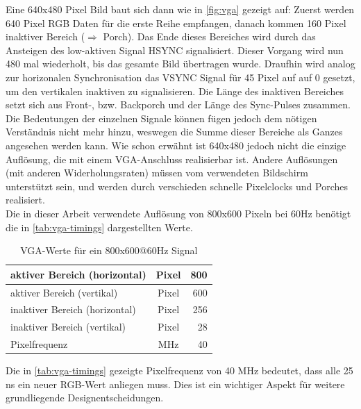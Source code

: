 \documentclass[a4paper,12pt,onesided]{report}
\begin{document}
Eine 640x480 Pixel Bild baut sich dann wie in \autoref{fig:vga} gezeigt auf:
Zuerst werden 640 Pixel RGB Daten für die erste Reihe empfangen, danach kommen 160 Pixel inaktiver Bereich ($\Rightarrow$ Porch). Das Ende dieses Bereiches wird durch das Ansteigen des low-aktiven Signal HSYNC signalisiert. Dieser Vorgang wird nun 480 mal wiederholt, bis das gesamte Bild übertragen wurde. Draufhin wird analog zur horizonalen Synchronisation das VSYNC Signal für 45 Pixel auf auf 0 gesetzt, um den vertikalen inaktiven zu signalisieren. Die Länge des inaktiven Bereiches setzt sich aus Front-, bzw. Backporch und der Länge des Sync-Pulses zusammen. Die Bedeutungen der einzelnen Signale können fügen jedoch dem nötigen Verständnis nicht mehr hinzu, weswegen die Summe dieser Bereiche als Ganzes angesehen werden kann.
Wie schon erwähnt ist 640x480 jedoch nicht die einzige Auflösung, die mit einem VGA-Anschluss realisierbar ist. Andere Auflösungen (mit anderen Widerholungsraten) müssen vom verwendeten Bildschirm unterstützt sein, und werden durch verschieden schnelle Pixelclocks und Porches realisiert.\\
Die in dieser Arbeit verwendete Auflösung von 800x600 Pixeln bei 60Hz benötigt die in \autoref{tab:vga-timings} dargestellten Werte.

\begin{table}[H]
	\centering
	\begin{tabular}{|l|c|r|}	
		\hline
		aktiver Bereich (horizontal) & Pixel & 800 \\ \hline
		aktiver Bereich (vertikal) & Pixel & 600 \\ \hline
		inaktiver Bereich (horizontal) & Pixel & 256 \\ \hline
		inaktiver Bereich (vertikal) & Pixel & 28 \\ \hline
		Pixelfrequenz & MHz & 40 \\ \hline
	\end{tabular}
	\caption{VGA-Werte für ein 800x600@60Hz Signal}
	\label{tab:vga-timings}
\end{table}

Die in \autoref{tab:vga-timings} gezeigte Pixelfrequenz von 40 MHz bedeutet, dass alle 25 ns ein neuer RGB-Wert anliegen muss. Dies ist ein wichtiger Aspekt für weitere grundliegende Designentscheidungen. %
\end{document}
